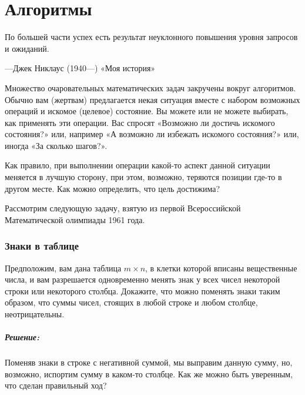﻿\chapter*{Алгоритмы}



\epigraph{По большей части успех есть результат неуклонного повышения уровня запросов и ожиданий.}{---Джек Никлаус (1940---) «Моя история»}

Множество очаровательных математических задач закручены вокруг алгоритмов.
Обычно вам (жертвам) предлагается некая ситуация вместе с набором возможных операций и искомое (целевое) состояние.
Вы можете или не можете выбирать, как применять эти операции.
Вас спросят «Возможно ли достичь искомого состояния?» или, например «А возможно ли избежать искомого состояния?» или, иногда «За сколько шагов?».

Как правило, при выполнении операции какой-то аспект данной ситуации меняется в лучшую сторону, при этом, возможно, теряются позиции где-то в другом месте.
Как можно определить, что цель достижима?

Рассмотрим следующую задачу, взятую из первой Всероссийской Математической олимпиады 1961 года.

\subsection*{Знаки в таблице}%

Предположим, вам дана таблица $m\times n$, в клетки которой вписаны вещественные числа, и вам разрешается одновременно менять знак у всех чисел некоторой строки или некоторого столбца.
Докажите, что можно поменять знаки таким образом, что суммы чисел, стоящих в любой строке и любом столбце, неотрицательны.

\paragraph{Решение:} Поменяв знаки в строке с негативной суммой, мы выправим данную сумму, но, возможно, испортим сумму в каком-то столбце.
Как же можно быть уверенным, что сделан правильный ход?


